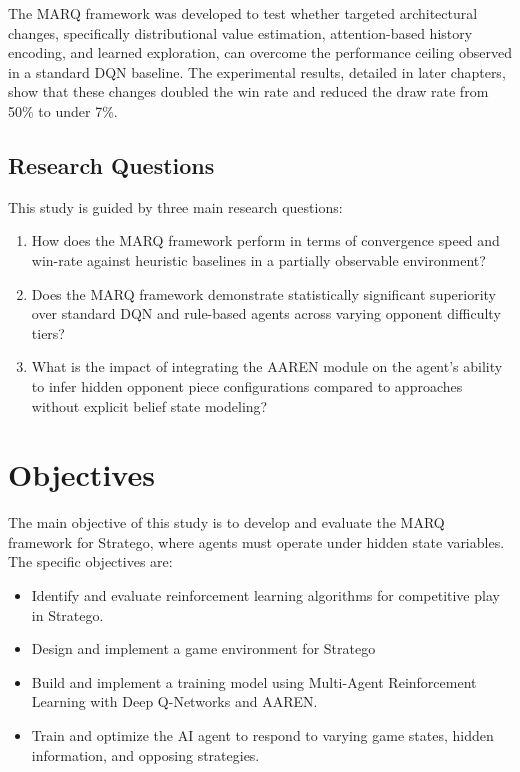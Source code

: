 The MARQ framework was developed to test whether targeted architectural changes, specifically distributional value estimation, attention-based history encoding, and learned exploration, can overcome the performance ceiling observed in a standard DQN baseline. The experimental results, detailed in later chapters, show that these changes doubled the win rate and reduced the draw rate from 50\% to under 7\%.
\subsection{Research Questions}
This study is guided by three main research questions:

\begin{enumerate}
   
    \item How does the MARQ framework perform in terms of convergence speed and win-rate against heuristic baselines in a partially observable environment?
    \item Does the MARQ framework demonstrate statistically significant superiority over standard DQN and rule-based agents across varying opponent difficulty tiers?
    \item What is the impact of integrating the AAREN module on the agent's ability to infer hidden opponent piece configurations compared to approaches without explicit belief state modeling?
\end{enumerate}

\section{Objectives}
The main objective of this study is to develop and evaluate the MARQ framework for Stratego, where agents must operate under hidden state variables. The specific objectives are:
\begin{itemize}
    \item Identify and evaluate reinforcement learning algorithms for competitive play in Stratego.
    \item Design and implement a game environment for Stratego
    \item Build and implement a training model using Multi-Agent Reinforcement Learning with Deep Q-Networks and AAREN.
    \item Train and optimize the AI agent to respond to varying game states, hidden information, and opposing strategies.
\end{itemize}


